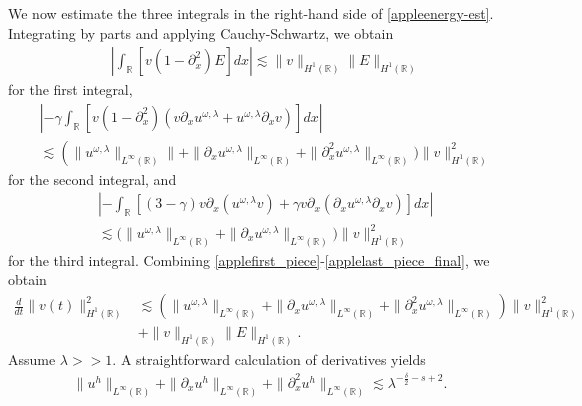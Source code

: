 \documentclass[12pt,reqno]{amsart}
\newcommand{\rr}{\mathbb{R}}
\newcommand{\p}{\partial}
\theoremstyle{plain}  %
\theoremstyle{definition}
\begin{document}
%
%
We now estimate the three integrals in the right-hand side of 
\eqref{appleenergy-est}. Integrating by parts and applying Cauchy-Schwartz,  
we obtain
%
%
%
\begin{equation}
	\begin{split}
\label{applefirst_piece}
& \left |\int_{\rr} \left [v (1- \p_x^2)E \right ] dx \right |
 \lesssim
\|v\|_{H^1(\rr)} \|E\|_{H^1(\rr)}
\end{split}
\end{equation}
for the first integral,
%
%
\begin{equation}
	\begin{split}
\label{applesecond-piece-final}
& \left | -\gamma \int_{\rr}
\left[ v\left( 1-\p_x^2 \right)\left( v \p_x u^{\omega,\lambda} + 
u^{\omega,\lambda} \p_x v
\right) \right] dx \right |
\\
& \lesssim \left( \|u^{\omega,\lambda}\|_{L^\infty(\rr)}\| + \|\p_x 
u^{\omega,\lambda}
\|_{L^\infty(\rr)} \right .  + \|\p_x^2 u^{\omega,\lambda} 
\|_{L^\infty(\rr)}
\big )\|v\|_{H^1(\rr)}^2
\end{split}
\end{equation}
for the second integral, and
\begin{equation}
	\begin{split}
\label{applelast_piece_final}
& \left | -\int_{\rr} \left[ \left( 3-\gamma \right)v
\p_x \left( u^{\omega,\lambda} v \right) + \gamma
v \p_x \left( \p_x u^{\omega,\lambda} \p_x v \right)\right]dx \right |
\\
& \lesssim \big(
\|u^{\omega,\lambda}\|_{L^\infty(\rr)}
+ \|\p_x u^{\omega,\lambda} \|_{L^\infty(\rr)} \big)
\|v\|_{H^1(\rr)}^2
\end{split}
\end{equation}
%
%
%
for the third integral. Combining 
\eqref{applefirst_piece}-\eqref{applelast_piece_final}, we 
obtain
%
%
\begin{equation}
\begin{split}
\label{appleenergy-estimate-best}
\frac{d}{dt} \|v(t)\|_{H^1(\rr)}^2
& \lesssim \left( \|u^{\omega,\lambda}\|_{L^\infty(\rr)} + \|
\p_x u^{\omega,\lambda} \|_{L^\infty(\rr)} + \|\p_x^2 u^{\omega,\lambda} 
\|_{L^\infty (\rr)} \right)
\|v\|_{H^1(\rr)}^2 \\
&+ \|v\|_{H^1(\rr)} \|E\|_{H^1(\rr)}.
\end{split}
\end{equation}
%
%
Assume $\lambda >>1$. A straightforward calculation of derivatives yields
%
%
\begin{equation*}
\begin{split}
\|u^h\|_{L^\infty(\rr)} + \|\p_x u^h\|_{L^\infty(\rr)} + \|\p_x^2
u^h\|_{L^\infty(\rr)} \lesssim \lambda^{- \frac{\delta}{2} - s +2 }.
\label{apple53}
\end{split}
\end{equation*}
\end{document}
